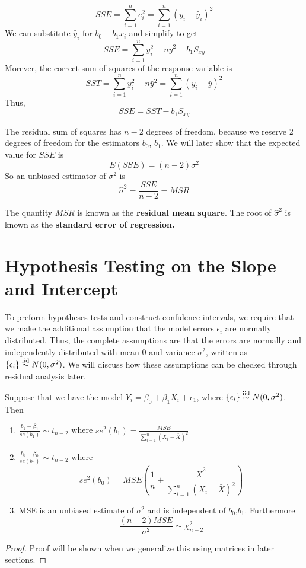 \[SSE = \sum_{i=1}^n e_i^2 = \sum_{i=1}^n (y_i - \hat{y}_i)^2\]
We can substitute $\hat{y}_i$ for $b_0 + b_1x_i$ and simplify to get 
\[SSE = \sum_{i=1}^n y_i^2 - n\bar{y}^2 - b_1S_{xy}\]
Morever, the correct sum of squares of the response variable is 
\[SST = \sum_{i=1}^n y_i^2 - n\bar{y}^2 = \sum_{i=1}^n (y_i - \bar{y})^2\]
Thus,
\[SSE = SST  - b_1S_{xy}\]

The residual sum of squares has $n-2$ degrees of freedom, because we reserve 2 degrees of freedom for the estimators $b_0$, $b_1$. We will later show that the expected value for $SSE$ is 
\[E(SSE) = (n-2)\sigma^2 \]
So an unbiased estimator of $\sigma^2$ is 
\[\hat{\sigma}^2 = \frac{SSE}{n-2} = MSR\]

The quantity $MSR$ is known as the \textbf{residual mean square}. The root of $\hat{\sigma}^2$ is known as the \textbf{standard error of regression.}

\section{Hypothesis Testing on the Slope and Intercept}

To preform hypotheses tests and construct confidence intervals, we require that we make the additional assumption that the model errors $\epsilon_i$ are normally distributed. Thus, the complete assumptions are that the errors are normally and independently distributed with mean 0 and variance $\sigma^2$, written as $\{\epsilon_i\} \overset{\mathrm{iid}}{\sim} N(0, \sigma^2)$. We will discuss how these assumptions can be checked through residual analysis later.

Suppose that we have the model $Y_i = \beta_0 + \beta_1X_i + \epsilon_1$, where $\{\epsilon_i\} \overset{\mathrm{iid}}{\sim} N(0,\sigma^2)$. Then 
\begin{enumerate}[label=(\alph*)]
    \item $\frac{b_1 - \beta_1}{se(b_1)} \sim t_{n-2}$ where $se^2(b_1) = \frac{MSE}{\sum_{i=1}^n (X_i - \bar{X})^2}$
    \item $\frac{b_0 - \beta_0}{se(b_0)} \sim t_{n-2}$ where 
    \[se^2(b_0) = MSE\left(\frac{1}{n} + \frac{\bar{X}^2}{\sum_{i=1}^n (X_i-\bar{X})^2}\right)\]
    \item MSE is an unbiased estimate of $\sigma^2$ and is independent of $b_0$,$b_1$. Furthermore
    \[\frac{(n-2)MSE}{\sigma^2} \sim \chi_{n-2}^2\]
\end{enumerate}
\begin{proof}
    Proof will be shown when we generalize this using matrices in later sections.
\end{proof}

